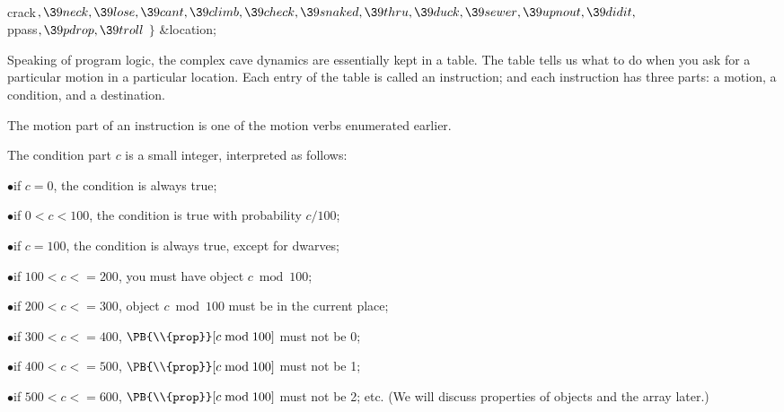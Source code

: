 \\{crack}${},\39\\{neck},\39\\{lose},\39\\{cant},\39\\{climb},\39\\{check},\39%
\\{snaked},\39\\{thru},\39\\{duck},\39\\{sewer},\39\\{upnout},\39\\{didit},{}$\6
\\{ppass}${},\39\\{pdrop},\39\\{troll}{}$\2\6
${}\}{}$ \&{location};\par
\fi

Speaking of program logic, the complex cave dynamics are essentially
kept in a table. The table tells us what to do when you ask for a particular
motion in a particular location. Each entry of the table is called
an instruction; and each instruction has three parts: a motion,
a condition, and a destination.

The motion part of an instruction is one of the motion verbs enumerated
earlier.

The condition part $c$ is a small integer, interpreted as follows:
\xdef\instspecs{\secno}

\smallskip
\item{$\bullet$}if $c=0$, the condition is always true;
\item{$\bullet$}if $0<c<100$, the condition is true with probability $c/100$;
\item{$\bullet$}if $c=100$, the condition is always true, except for dwarves;
\item{$\bullet$}if $100<c<=200$, you must have object $c\bmod100$;
\item{$\bullet$}if $200<c<=300$, object $c\bmod100$ must be in the current
place;
\item{$\bullet$}if $300<c<=400$, $\PB{\\{prop}}[c\bmod100]$ must not be 0;
\item{$\bullet$}if $400<c<=500$, $\PB{\\{prop}}[c\bmod100]$ must not be 1;
\item{$\bullet$}if $500<c<=600$, $\PB{\\{prop}}[c\bmod100]$ must not be 2; etc.
\smallskip
\noindent (We will discuss properties of objects and the  array
later.)

